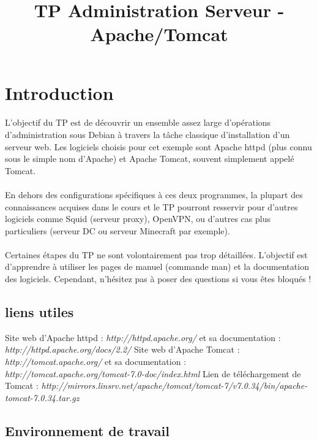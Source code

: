 \documentclass[12pt,a4paper]{article}
\title{TP Administration Serveur - Apache/Tomcat}
\begin{document}
\maketitle{}

\section{Introduction}
\paragraph{}
L'objectif du TP est de découvrir un ensemble assez large d'opérations d'administration sous Debian à travers la tâche classique d'installation d'un serveur web. Les logiciels choisis pour cet exemple sont Apache httpd (plus connu sous le simple nom d'Apache) et Apache Tomcat, souvent simplement appelé Tomcat.

\paragraph{}
En dehors des configurations spécifiques à ces deux programmes, la plupart des connaissances acquises dans le cours et le TP pourront resservir pour d'autres logiciels comme Squid (serveur proxy), OpenVPN, ou d'autres cas plus particuliers (serveur DC ou serveur Minecraft par exemple).

\paragraph{}
Certaines étapes du TP ne sont volontairement pas trop détaillées. L'objectif est d'apprendre à utiliser les pages de manuel (commande man) et la documentation des logiciels. Cependant, n'hésitez pas à poser des questions si vous êtes bloqués !

\subsection*{liens utiles}
    
Site web d'Apache httpd : \textit{http://httpd.apache.org/} et sa documentation : \textit{http://httpd.apache.org/docs/2.2/}
Site web d'Apache Tomcat : \textit{http://tomcat.apache.org/} et sa documentation : \textit{http://tomcat.apache.org/tomcat-7.0-doc/index.html}
Lien de téléchargement de Tomcat : \textit{http://mirrors.linsrv.net/apache/tomcat/tomcat-7/v7.0.34/bin/apache-tomcat-7.0.34.tar.gz}

\subsection*{Environnement de travail}
\end{document}
